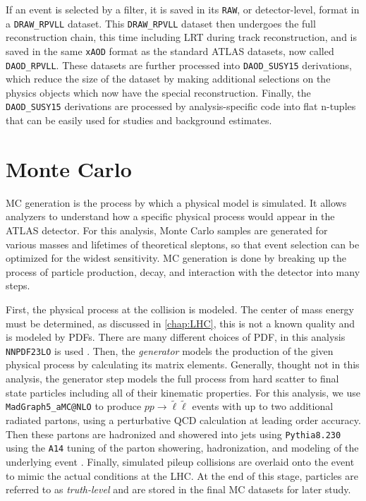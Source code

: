 If an event is selected by a filter, it is saved in its \texttt{RAW}, or detector-level, format in a \texttt{DRAW\_RPVLL} dataset. This \texttt{DRAW\_RPVLL} dataset then undergoes the full reconstruction chain, this time including \ac{LRT} during track reconstruction, and is saved in the same \texttt{xAOD} format as the standard \ac{ATLAS} datasets, now called \texttt{DAOD\_RPVLL}. These datasets are further processed into \texttt{DAOD\_SUSY15} derivations, which reduce the size of the dataset by making additional selections on the physics objects which now have the special reconstruction. Finally, the \texttt{DAOD\_SUSY15} derivations are processed by analysis-specific code into flat n-tuples that can be easily used for studies and background estimates. 

\section{\label{sec:mc}Monte Carlo}

\ac{MC} generation is the process by which a physical model is simulated. It allows analyzers to understand how a specific physical process would appear in the \ac{ATLAS} detector. For this analysis, Monte Carlo samples are generated for various masses and lifetimes of theoretical sleptons, so that event selection can be optimized for the widest sensitivity. MC generation is done by breaking up the process of particle production, decay, and interaction with the detector into many steps. 


First, the physical process at the collision is modeled. The center of mass energy must be determined, as discussed in \autoref{chap:LHC}, this is not a known quality and is modeled by \ac{PDF}s. There are many different choices of \ac{PDF}, in this analysis \texttt{NNPDF23LO} is used \cite{pdfs} . Then, the \emph{generator} models the production of the given physical process by calculating its matrix elements. Generally, thought not in this analysis, the generator step models the full process from hard scatter to final state particles including all of their kinematic properties. For this analysis, we use \texttt{MadGraph5\_aMC@NLO} \cite{madgraph} to produce $pp \rightarrow \tilde{\ell}\tilde{\ell}$ events with up to two additional radiated partons, using a perturbative \ac{QCD} calculation at leading order accuracy. Then these partons are hadronized and showered into jets using \texttt{Pythia8.230} using the \texttt{A14} tuning of the parton showering, hadronization, and modeling of the underlying event \cite{atlas-pythia}. Finally, simulated pileup collisions are overlaid onto the event to mimic the actual conditions at the \ac{LHC}. At the end of this stage, particles are referred to as \emph{truth-level} and are stored in the final \ac{MC} datasets for later study.

